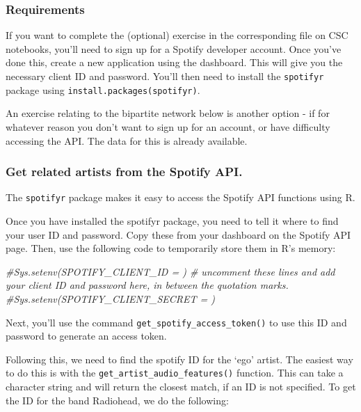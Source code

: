 \documentclass[
]{book}
\newenvironment{Shaded}{\begin{snugshade}}{\end{snugshade}}
\newcommand{\CommentTok}[1]{\textcolor[rgb]{0.56,0.35,0.01}{\textit{#1}}}
\begin{document}
\hypertarget{requirements}{%
\subsubsection{Requirements}\label{requirements}}

If you want to complete the (optional) exercise in the corresponding file on CSC notebooks, you'll need to sign up for a Spotify developer account. Once you've done this, create a new application using the dashboard. This will give you the necessary client ID and password. You'll then need to install the \texttt{spotifyr} package using \texttt{install.packages(\textquotesingle{}spotifyr)}.

An exercise relating to the bipartite network below is another option - if for whatever reason you don't want to sign up for an account, or have difficulty accessing the API. The data for this is already available.

\hypertarget{get-related-artists-from-the-spotify-api.}{%
\subsubsection{Get related artists from the Spotify API.}\label{get-related-artists-from-the-spotify-api.}}

The \texttt{spotifyr} package makes it easy to access the Spotify API functions using R.

Once you have installed the spotifyr package, you need to tell it where to find your user ID and password. Copy these from your dashboard on the Spotify API page. Then, use the following code to temporarily store them in R's memory:

\begin{Shaded}
\begin{Highlighting}[]
 \CommentTok{\#Sys.setenv(SPOTIFY\_CLIENT\_ID = \textquotesingle{}\textquotesingle{}) \# uncomment these lines and add your client ID and password here, in between the quotation marks. }
 \CommentTok{\#Sys.setenv(SPOTIFY\_CLIENT\_SECRET = \textquotesingle{}\textquotesingle{})}
\end{Highlighting}
\end{Shaded}

Next, you'll use the command \texttt{get\_spotify\_access\_token()} to use this ID and password to generate an access token.

Following this, we need to find the spotify ID for the `ego' artist. The easiest way to do this is with the \texttt{get\_artist\_audio\_features()} function. This can take a character string and will return the closest match, if an ID is not specified. To get the ID for the band Radiohead, we do the following:
\end{document}
